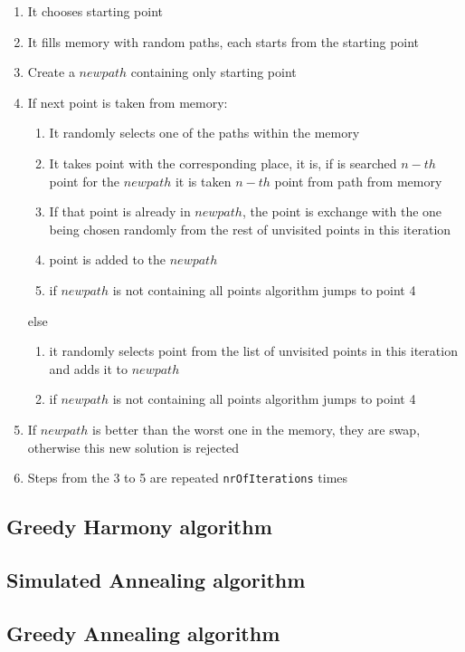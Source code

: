 \documentclass[titlepage]{article}
\begin{document}
\begin{enumerate}
	\item It chooses starting point
	\item It fills memory with random paths, each starts from the starting point
	\item Create a $new path$ containing only starting point
	\item If next point is taken from memory:
	\begin{enumerate}[label*=\arabic*.]
		\item It randomly selects one of the paths within the memory
		\item It takes point with the corresponding place, it is, if is searched $n-th$ point for the $new path$ it is taken $n-th$ point from path from memory
		\item If that point is already in $new path$, the point is exchange with the one being chosen randomly from the rest of unvisited points in this iteration
		\item point is added to the $new path$
		\item if $new path$ is not containing all points algorithm jumps to point 4
	\end{enumerate}
	else
	\begin{enumerate}[label*=\arabic*.]
		\item it randomly selects point from the list of unvisited points in this iteration and adds it to $new path$
		\item if $new path$ is not containing all points algorithm jumps to point 4
	\end{enumerate}
	\item If $new path$ is better than the worst one in the memory, they are swap, otherwise this new solution is rejected
	\item Steps from the 3 to 5 are repeated \texttt{nrOfIterations} times
	
\end{enumerate}

\subsection{Greedy Harmony algorithm}

\subsection{Simulated Annealing algorithm}

\subsection{Greedy Annealing algorithm}
\end{document}
